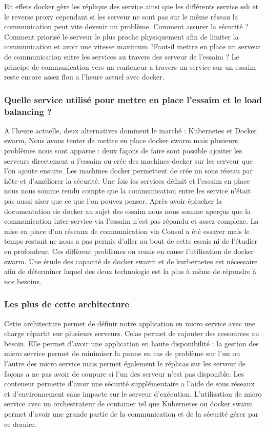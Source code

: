 En effets docker gère les réplique des service ainsi que les différents service ssh et le reverse proxy cependant si les serveur ne sont pas sur le même réseau la communication peut vite devenir un problème. Comment assurer la sécurité ? Comment priorisé le serveur le plus proche physiquement afin de limiter la communication et avoir une vitesse maximum ?Faut-il mettre en place un serveur de communication entre les services au travers des serveur de l’essaim  ? Le principe de communication vers un conteneur a travers un service sur un essaim reste encore assez flou a l’heure actuel avec docker. 

	\subsubsection{Quelle service utilisé pour mettre en place l’essaim et le load balancing ?}

\par A l’heure actuelle, deux alternatives dominent le marché : Kubernetes et Docker swarm, Nous avons tenter de mettre en place docker swarm mais plusieurs problèmes nous sont apparue : deux façons de faire sont possible ajouter les serveurs directement a l’essaim ou crée des machines-docker sur les serveur que l’on ajoute ensuite. Les machines docker  permettent de crée un sous réseau par hôte et d’améliorer la sécurité. Une fois les services définit et l’essaim en place nous nous somme rendu compte que la communication entre les service n’était pas aussi aiser que ce que l’on pouvez penser.   Après avoir éplucher la documentation de docker au sujet des essaim nous nous somme aperçus que la communication inter-service via l’essaim n’est pas répandu et assez complexe. La mise en place d’un réseaux de communication via Consul a été essayer mais le temps restant ne nous a pas permis d’aller au bout de cette essais ni de l’étudier en profondeur. Ces différent problèmes on remis en cause l’utilisation de docker swarm. Une étude des capacité de docker swarm et de kurbernetes est nécessaire afin de déterminer laquel des deux technologie est la plus à même de répondre à nos besoins.

\subsubsection{Les plus de cette architecture}

\par Cette architecture permet de définir notre application en micro service avec une charge répartit sur plusieurs serveurs. Celas permet de rajouter des ressources au besoin. Elle permet d’avoir une application en haute disponibilité : la gestion des micro service permet de minimiser la panne en cas de problème sur l’un ou l’autre des micro service mais permet également le réplicas sur les serveur de façons a ne pas avoir de coupure si l’un des serveur n’est pas disponible. Les conteneur permette d’avoir une sécurité supplémentaire a l’aide de sous réseaux et d’environnement sans impacte sur le serveur d’exécution. L’utilisation de micro service avec un orchestrateur de container tel que Kubernetes ou docker swarm permet d’avoir une grande partie de la communication et de la sécurité gérer par ce dernier.   

